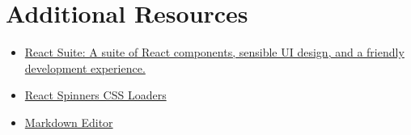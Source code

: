 \section{Additional Resources}

\begin{itemize}[leftmargin=*]
    \item \href{https://rsuitejs.com/en/}{React Suite: A suite of React components, sensible UI design, and a friendly development experience.}
    \item \href{https://github.com/JoshK2/react-spinners-css}{React Spinners CSS Loaders}
    \item \href{https://github.com/uiwjs/react-md-editor}{Markdown Editor}
\end{itemize}
